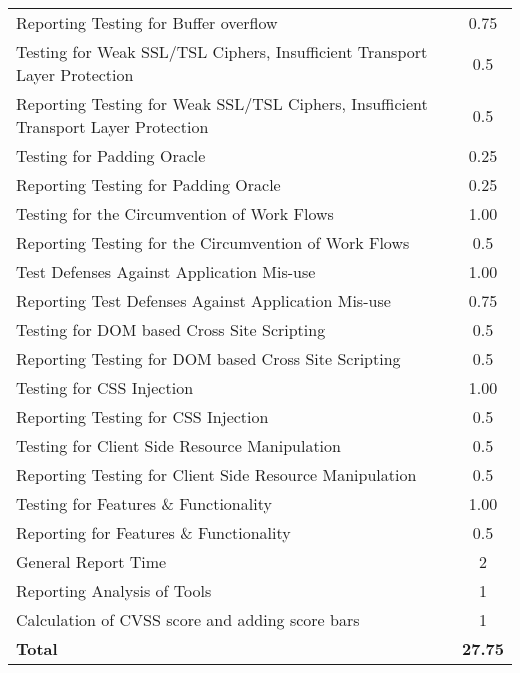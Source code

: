 \begin{table}[H]
\begin{tabular*}{\textwidth}{@{\extracolsep{\fill}} l c@{\extracolsep{0pt}} }
Reporting Testing for Buffer overflow       & 0.75 \\
Testing for Weak SSL/TSL Ciphers, Insufficient Transport Layer Protection & 0.5 \\
Reporting Testing for Weak SSL/TSL Ciphers, Insufficient Transport Layer Protection & 0.5 \\
Testing for Padding Oracle					& 0.25 \\
Reporting Testing for Padding Oracle 		& 0.25 \\
Testing for the Circumvention of Work Flows	& 1.00 \\
Reporting Testing for the Circumvention of Work Flows & 0.5 \\
Test Defenses Against Application Mis-use	& 1.00 \\
Reporting Test Defenses Against Application Mis-use & 0.75 \\
Testing for DOM based Cross Site Scripting	& 0.5 \\
Reporting Testing for DOM based Cross Site Scripting & 0.5 \\
Testing for CSS Injection					& 1.00 \\
Reporting Testing for CSS Injection         & 0.5 \\
Testing for Client Side Resource Manipulation & 0.5 \\
Reporting Testing for Client Side Resource Manipulation & 0.5 \\
Testing for Features \& Functionality       & 1.00 \\
Reporting for Features \& Functionality     & 0.5 \\
General Report Time							& 2 \\
Reporting Analysis of Tools                 & 1 \\
Calculation of CVSS score and adding score bars & 1 \\ \hline\hline
\textbf{Total}								& \textbf{27.75}
\end{tabular*}
\end{table}